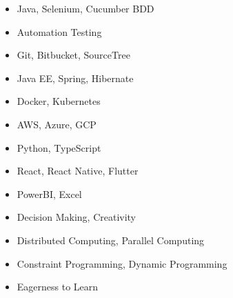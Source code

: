 \documentclass[a4paper,12pt]{memoir} %
\begin{document}


\Sep %




{\begin{itemize}
	\item Java, Selenium, Cucumber BDD
	\item Automation Testing
	\item Git, Bitbucket, SourceTree
	\item Java EE, Spring, Hibernate
	\item Docker, Kubernetes
	\item AWS, Azure, GCP
\end{itemize}}


{\begin{itemize}
	\item Python, TypeScript
	\item React, React Native, Flutter
	\item PowerBI, Excel
	\item Decision Making, Creativity
	\item Distributed Computing, Parallel Computing
	\item Constraint Programming, Dynamic Programming
	\item Eagerness to Learn
\end{itemize}}


\Sep %

\end{document}
